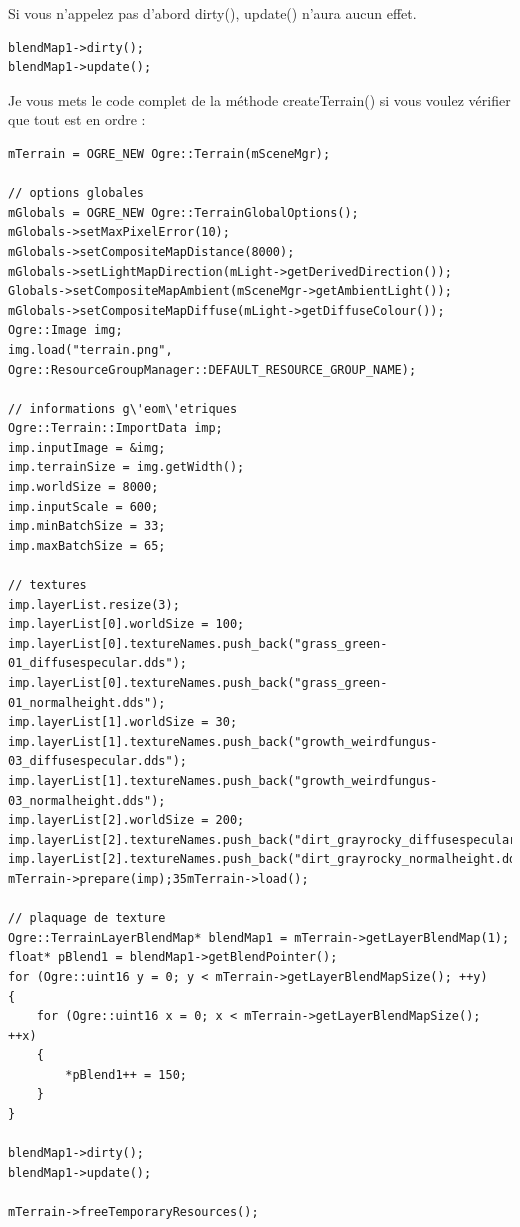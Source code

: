 Si vous n'appelez pas d'abord dirty(), update() n'aura aucun effet.

\begin{lstlisting}[caption={Mise \`a jour de la Blend Map}]
blendMap1->dirty();
blendMap1->update();
\end{lstlisting}

Je vous mets le code complet de la m\'ethode createTerrain() si vous voulez v\'erifier que tout est en ordre :

\begin{lstlisting}[caption={createTerrain (code complet)}]
mTerrain = OGRE_NEW Ogre::Terrain(mSceneMgr);

// options globales
mGlobals = OGRE_NEW Ogre::TerrainGlobalOptions();
mGlobals->setMaxPixelError(10);
mGlobals->setCompositeMapDistance(8000);
mGlobals->setLightMapDirection(mLight->getDerivedDirection());
Globals->setCompositeMapAmbient(mSceneMgr->getAmbientLight());
mGlobals->setCompositeMapDiffuse(mLight->getDiffuseColour());
Ogre::Image img;
img.load("terrain.png", Ogre::ResourceGroupManager::DEFAULT_RESOURCE_GROUP_NAME);

// informations g\'eom\'etriques
Ogre::Terrain::ImportData imp;
imp.inputImage = &img;
imp.terrainSize = img.getWidth();
imp.worldSize = 8000;
imp.inputScale = 600;
imp.minBatchSize = 33;
imp.maxBatchSize = 65;

// textures
imp.layerList.resize(3);
imp.layerList[0].worldSize = 100;
imp.layerList[0].textureNames.push_back("grass_green-01_diffusespecular.dds");
imp.layerList[0].textureNames.push_back("grass_green-01_normalheight.dds");
imp.layerList[1].worldSize = 30;
imp.layerList[1].textureNames.push_back("growth_weirdfungus-03_diffusespecular.dds");
imp.layerList[1].textureNames.push_back("growth_weirdfungus-03_normalheight.dds");
imp.layerList[2].worldSize = 200;
imp.layerList[2].textureNames.push_back("dirt_grayrocky_diffusespecular.dds");
imp.layerList[2].textureNames.push_back("dirt_grayrocky_normalheight.dds");
mTerrain->prepare(imp);35mTerrain->load();

// plaquage de texture
Ogre::TerrainLayerBlendMap* blendMap1 = mTerrain->getLayerBlendMap(1);
float* pBlend1 = blendMap1->getBlendPointer();
for (Ogre::uint16 y = 0; y < mTerrain->getLayerBlendMapSize(); ++y)
{
    for (Ogre::uint16 x = 0; x < mTerrain->getLayerBlendMapSize(); ++x)
    {
        *pBlend1++ = 150;
    }
}

blendMap1->dirty();
blendMap1->update();

mTerrain->freeTemporaryResources();
\end{lstlisting}

